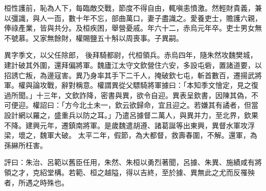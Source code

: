 \begin{pinyinscope}
 
 
 
 桓性護前，恥為人下，每臨敵交戰，節度不得自由，輒嗔恚憤激。然輕財貴義，兼以彊識，與人一靣，數十年不忘，部曲萬口，妻子盡識之。愛養吏士，贍護六親，俸祿產業，皆與共分。及桓疾困，舉營憂戚。年六十二，赤烏元年卒。吏士男女無不號慕。又家無餘財，權賜鹽五十斛以周喪事。子異嗣。
 
 
異字季文，以父任除郎，
 後拜騎都尉，代桓領兵。赤烏四年，隨朱然攻魏樊城，建計破其外圍，還拜偏將軍。魏廬江太守文欽營住六安，多設屯砦，置諸道要，以招誘亡叛，為邊寇害。異乃身率其手下二千人，掩破欽七屯，斬首數百，遷揚武將軍。權與論攻戰，辭對稱意。權謂異從父驃騎將軍據曰：「本知季文懀定，見之復過所聞。」十三年，文欽詐降，密書與異，欲令自迎。異表呈欽書，因陳其偽，不可便迎。權詔曰：「方今北土未一，欽云欲歸命，宜且迎之。若嫌其有譎者，但當設計網以羅之，盛重兵以防之耳。」乃遣呂據督二萬人，與異并力，至北界，欽果不降。建興元年，遷鎮南將軍。是歲魏遣胡遵、諸葛誕等出東興，異督水軍攻浮梁，壞之，魏軍大破。
 太平二年，假節，為大都督，救壽春圍，不解。還軍，為孫綝所枉害。
 
 
 
 
 評曰：朱治、呂範以舊臣任用，朱然、朱桓以勇烈著聞，呂據、朱異、施績咸有將領之才，克紹堂構。若範、桓之越隘，得以吉終，至於據、異無此之尤而反罹殃者，所遇之時殊也。
 
 
\end{pinyinscope}